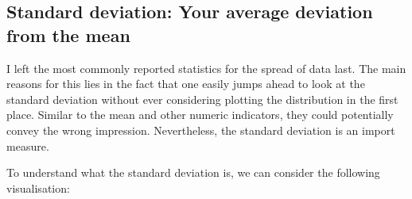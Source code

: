 \documentclass[
]{book}
\newenvironment{Shaded}{\begin{snugshade}}{\end{snugshade}}
\newcommand{\AttributeTok}[1]{\textcolor[rgb]{0.77,0.63,0.00}{#1}}
\newcommand{\CommentTok}[1]{\textcolor[rgb]{0.56,0.35,0.01}{\textit{#1}}}
\newcommand{\ConstantTok}[1]{\textcolor[rgb]{0.00,0.00,0.00}{#1}}
\newcommand{\FunctionTok}[1]{\textcolor[rgb]{0.00,0.00,0.00}{#1}}
\newcommand{\NormalTok}[1]{#1}
\newcommand{\OtherTok}[1]{\textcolor[rgb]{0.56,0.35,0.01}{#1}}
\newcommand{\SpecialCharTok}[1]{\textcolor[rgb]{0.00,0.00,0.00}{#1}}
\newcommand{\StringTok}[1]{\textcolor[rgb]{0.31,0.60,0.02}{#1}}
\begin{document}
\hypertarget{standard-deviation}{%
\subsection{Standard deviation: Your average deviation from the mean}\label{standard-deviation}}

I left the most commonly reported statistics for the spread of data last. The main reasons for this lies in the fact that one easily jumps ahead to look at the standard deviation without ever considering plotting the distribution in the first place. Similar to the mean and other numeric indicators, they could potentially convey the wrong impression. Nevertheless, the standard deviation is an import measure.

To understand what the standard deviation is, we can consider the following visualisation:

\begin{Shaded}
\end{Shaded}
\end{document}
